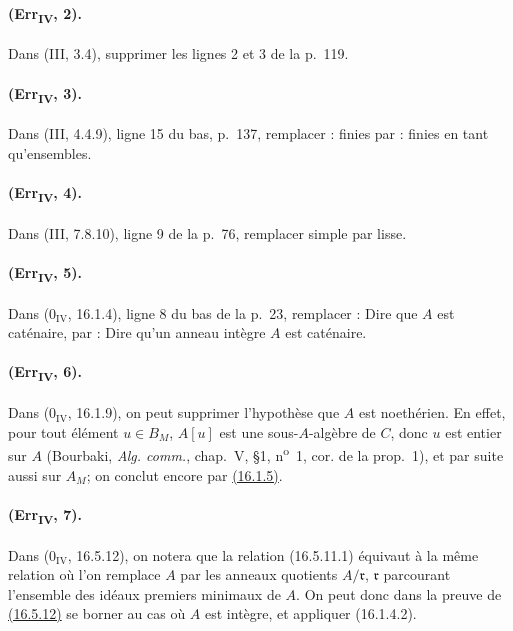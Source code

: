 \paragraph{(Err\textsubscript{IV}, 2).}
Dans (III, 3.4), supprimer les lignes 2 et 3 de la p.~119.

\paragraph{(Err\textsubscript{IV}, 3).}
Dans (III, 4.4.9), ligne 15 du bas, p.~137, remplacer : finies par :
finies en tant qu'ensembles.

\paragraph{(Err\textsubscript{IV}, 4).}
Dans (III, 7.8.10), ligne 9 de la p.~76, remplacer simple par lisse.

\paragraph{(Err\textsubscript{IV}, 5).}
Dans ($0_{\mathrm{IV}}$, 16.1.4), ligne 8 du bas de la p.~23, remplacer :
Dire que $A$ est caténaire, par : Dire qu'un anneau intègre $A$ est
caténaire.

\paragraph{(Err\textsubscript{IV}, 6).}
Dans ($0_{\mathrm{IV}}$, 16.1.9), on peut supprimer l'hypothèse que
$A$ est noethérien. En effet, pour tout élément $u\in B_M$, $A[u]$
est une sous-$A$-algèbre de $C$, donc $u$ est entier sur $A$ (Bourbaki,
\emph{Alg. comm.}, chap.~V, \S1, n\textsuperscript{o}~1, cor. de la
prop.~1), et par suite aussi sur $A_M$; on conclut encore par
{\hyperlink{ega4.c04.prop.16-1-5}{(16.1.5)}}.

\paragraph{(Err\textsubscript{IV}, 7).}
Dans ($0_{\mathrm{IV}}$, 16.5.12), on notera que la relation
(16.5.11.1) équivaut à la même relation où l'on remplace $A$ par les
anneaux quotients $A/\mathfrak r$, $\mathfrak r$ parcourant l'ensemble
des idéaux premiers minimaux de $A$. On peut donc dans la preuve de
{\hyperlink{ega4.c04.statement.16-5-12}{(16.5.12)}} se borner au cas
où $A$ est intègre, et appliquer (16.1.4.2).

